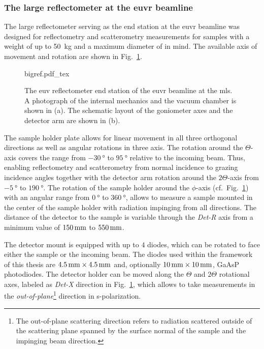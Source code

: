 \subsubsection{The large reflectometer at the \gls{euvr} beamline}
The large reflectometer serving as the end station at the \gls{euvr} beamline was designed for reflectometry and scatterometry measurements for samples with a weight of up to \SI{50}{\kg} and a maximum diameter of  in mind\cite{tummler_characterization_2003}. The available axis of movement and rotation are shown in Fig.~\ref{ch_exp:fig_bigref}.
\begin{figure}[htb]
    \def\svgwidth{\textwidth}
    {bigref.pdf_tex}
    \caption[The BigRef.]{The \gls{euv} reflectometer end station of the \gls{euvr} beamline at the \gls{mls}. A photograph of the internal mechanics and the vacuum chamber is shown in (a). The schematic layout of the goniometer axes and the detector arm are shown in (b).}
    \label{ch_exp:fig_bigref}
\end{figure}
The sample holder plate allows for linear movement in all three orthogonal directions as well as angular rotations in three axis. The rotation around the $\Theta$-axis covers the range from $\SI{-30}{\degree}$ to $\SI{95}{\degree}$ relative to the incoming beam. Thus, enabling reflectometry and scatterometry from normal incidence to grazing incidence angles together with the detector arm rotation around the $2\Theta$-axis from $\SI{-5}{\degree}$ to $\SI{190}{\degree}$. The rotation of the sample holder around the $\phi$-axis (cf.~Fig.~\ref{ch_exp:fig_bigref}) with an angular range from $\SI{0}{\degree}$ to $\SI{360}{\degree}$, allows to measure a sample mounted in the center of the sample holder with radiation impinging from all directions. The distance of the detector to the sample is variable through the \emph{Det-R} axis from a minimum value of $\mm{150}$ to $\mm{550}$.

The detector mount is equipped with up to $4$ diodes, which can be rotated to face either the sample or the incoming beam. The diodes used within the framework of this thesis are $\mm{4.5} \times \mm{4.5}$ and, optionally $\mm{10} \times \mm{10}$, GaAsP photodiodes. The detector holder can be moved along the $\Theta$ and $2\Theta$ rotational axes, labeled as \emph{Det-X} direction in Fig.~\ref{ch_exp:fig_bigref}, which allows to take measurements in the \emph{out-of-plane}\footnote{The out-of-plane scattering direction refers to radiation scattered outside of the scattering plane spanned by the surface normal of the sample and the impinging beam direction.} direction in s-polarization.

